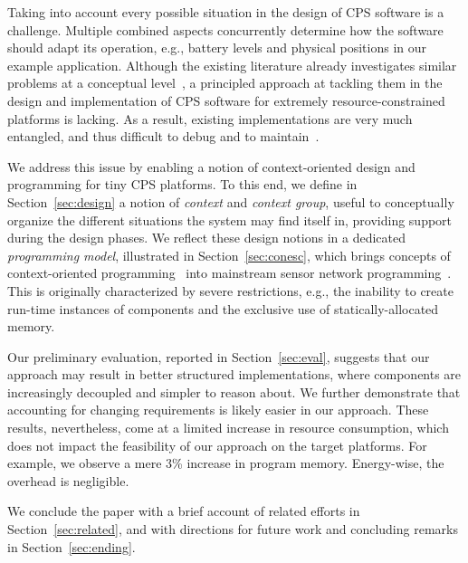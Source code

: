 Taking into account every possible
situation in the design of CPS software is a challenge. Multiple
combined aspects concurrently determine how the software should adapt
its operation, e.g., battery levels and physical positions in our
example application. Although the existing literature already
investigates similar problems at a conceptual level~\cite{}, a
principled approach at tackling them in the design and implementation
of CPS software for extremely resource-constrained platforms is
lacking. As a result, existing implementations 
are very much entangled, and thus difficult to debug and to
maintain~\cite{programmingsurvey}.

We address this issue by enabling a notion of context-oriented design
and programming for tiny CPS platforms. To this end, we define in
Section~\ref{sec:design} a notion of \emph{context} and \emph{context
  group}, useful to conceptually organize the different situations the
system may find itself in, providing support during the design
phases. We reflect these design notions in a dedicated
\emph{programming model}, illustrated in Section~\ref{sec:conesc},
which brings concepts of context-oriented programming~\cite{cop} into 
mainstream sensor network programming~\cite{tinyos}. This
is originally characterized by severe restrictions, e.g., the
inability to create run-time instances of components and the exclusive
use of statically-allocated memory.

Our preliminary evaluation, reported in Section~\ref{sec:eval},
suggests that our approach may result in better structured
implementations, where components are increasingly decoupled and
simpler to reason about. We further demonstrate that accounting for
changing requirements is likely easier in our approach. These results,
nevertheless, come at a limited increase in resource consumption,
which does not impact the feasibility of our approach on the target
platforms. For example, we observe a mere 3\% increase in program
memory. Energy-wise, the overhead is negligible.

We conclude the paper with a brief account of related efforts in
Section~\ref{sec:related}, and with directions for future work and
concluding remarks in Section~\ref{sec:ending}.




